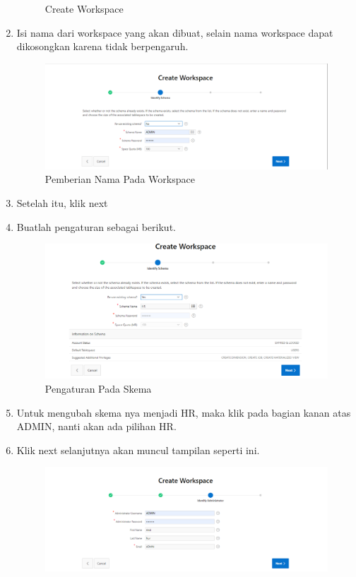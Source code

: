 \begin{enumerate}
\begin{figure}[!htbp]
        \caption{Create Workspace}
    \end{figure}
\newpage
    \item Isi nama dari workspace yang akan dibuat, selain nama workspace dapat dikosongkan karena tidak berpengaruh.
    \begin{figure}[!htbp]
        \centering
        \includegraphics[scale=0.3]{figures/n3.PNG}
        \caption{Pemberian Nama Pada Workspace}
    \end{figure}
    \item Setelah itu, klik next
    \item Buatlah pengaturan sebagai berikut.
    \begin{figure}[!htbp]
        \centering
        \includegraphics[scale=0.3]{figures/n4.PNG}
        \caption{Pengaturan Pada Skema}
    \end{figure}
    \item Untuk mengubah skema nya menjadi HR, maka klik pada bagian kanan atas ADMIN, nanti akan ada pilihan HR.
    \item Klik next selanjutnya akan muncul tampilan seperti ini.
    \begin{figure}[!htbp]
         \centering
        \includegraphics[scale=0.3]{figures/n5.PNG}

\end{figure}
\end{enumerate}
